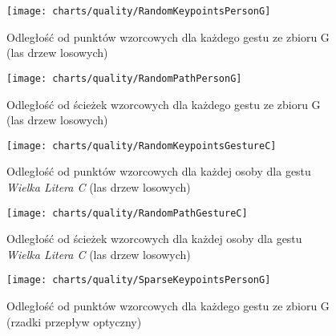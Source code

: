     \newpage
      \begin{figure}[!ht]
        \centering
        \texttt{[image: charts/quality/RandomKeypointsPersonG]}
        \caption[Odległość od punktów wzorcowych dla każdego gestu (las drzew losowych)]
                {Odległość od punktów wzorcowych dla każdego gestu ze zbioru G\\(las drzew losowych)}
        \label{fig:RandomKeypointsPersonG}
      \end{figure}

      \begin{figure}[!ht]
        \centering
        \texttt{[image: charts/quality/RandomPathPersonG]}
        \caption[Odległość od ścieżek wzorcowych dla każdego gestu (las drzew losowych)]
                {Odległość od ścieżek wzorcowych dla każdego gestu ze zbioru G\\(las drzew losowych)}
        \label{fig:RandomPathPersonG}
      \end{figure}

    \newpage
      \begin{figure}[!ht]
        \centering
        \texttt{[image: charts/quality/RandomKeypointsGestureC]}
        \caption[Odległość od punktów wzorcowych dla każdej osoby dla gestu C (las drzew losowych)]
                {Odległość od punktów wzorcowych dla każdej osoby dla gestu\\
                 \textit{Wielka Litera C} (las drzew losowych)}
        \label{fig:RandomKeypointsGestureC}
      \end{figure}

      \begin{figure}[!ht]
        \centering
        \texttt{[image: charts/quality/RandomPathGestureC]}
        \caption[Odległość od ścieżek wzorcowych dla każdej osoby dla gestu C (las drzew losowych)]
                {Odległość od ścieżek wzorcowych dla każdej osoby dla gestu\\
                 \textit{Wielka Litera C} (las drzew losowych)}
        \label{fig:RandomPathGestureC}
      \end{figure}

    \newpage
      \begin{figure}[!ht]
        \centering
        \texttt{[image: charts/quality/SparseKeypointsPersonG]}
        \caption[Odległość od punktów wzorcowych dla każdego gestu (rzadki przepływ optyczny)]
                {Odległość od punktów wzorcowych dla każdego gestu ze zbioru G\\(rzadki przepływ optyczny)}
        \label{fig:SparseKeypointsPersonG}
      \end{figure}

